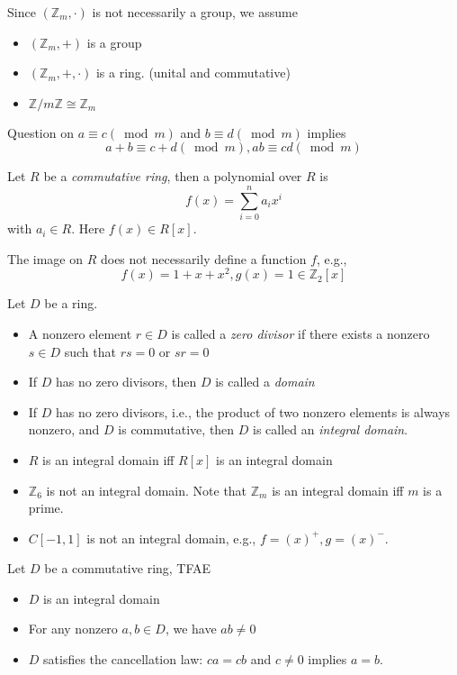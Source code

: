 Since $(\mathbb{Z}_m,\cdot)$ is not necessarily a group, we assume
\begin{itemize}
\item
$(\mathbb{Z}_m,+)$ is a group
\item
$(\mathbb{Z}_m,+,\cdot)$ is a ring. (unital and commutative)
\item
$\mathbb{Z}/m\mathbb{Z}\cong\mathbb{Z}_m$
\end{itemize}
\begin{proposition}
Question on $a\equiv c(\bmod m)$ and $b\equiv d(\bmod m)$ implies
\[
a+b\equiv c+d(\bmod m),
ab\equiv cd(\bmod m)
\]
\end{proposition}
\begin{definition}
Let $R$ be a \emph{commutative ring}, then a polynomial over $R$ is
\[
f(x)=\sum_{i=0}^na_ix^i
\]
with $a_i\in R$. Here $f(x)\in R[x]$.
\end{definition}
\begin{remark}
The image on $R$ does not necessarily define a function $f$, e.g.,
\[
f(x)=1+x+x^2,g(x)=1\in\mathbb{Z}_2[x]
\]
\end{remark}
\begin{definition}
Let $D$ be a ring. 
\begin{itemize}
\item
A nonzero element $r\in D$ is called a \emph{zero divisor} if there exists a nonzero $s\in D$ such that $rs=0$ or $sr=0$
\item
If $D$ has no zero divisors, then $D$ is called a \emph{domain}
\item
If $D$ has no zero divisors, i.e., the product of two nonzero elements is always nonzero, and $D$ is commutative, then $D$ is called an \emph{integral domain}.
\end{itemize}
\end{definition}
\begin{remark}
\begin{itemize}
\item
$R$ is an integral domain iff $R[x]$ is an integral domain
\item
$\mathbb{Z}_6$ is not an integral domain. Note that $\mathbb{Z}_m$ is an integral domain iff $m$ is a prime.
\item
$C[-1,1]$ is not an integral domain, e.g., $f=(x)^+,g=(x)^-$.
\end{itemize}
\end{remark}
\begin{proposition}
Let $D$ be a commutative ring, TFAE
\begin{itemize}
\item
$D$ is an integral domain
\item
For any nonzero $a,b\in D$, we have $ab\ne0$
\item
$D$ satisfies the cancellation law: $ca=cb$ and $c\ne0$ implies $a=b$.
\end{itemize}
\end{proposition}
